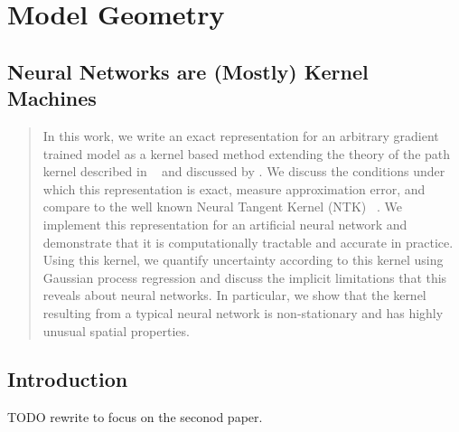 \chapter{Model Geometry}

\label{Chapter3} %

\section{Neural Networks are (Mostly) Kernel Machines}

\begin{abstract}
In this work, we write an exact representation for an arbitrary gradient trained model as a kernel based method extending the theory of the path kernel described in ~\cite{domingos2020} and discussed by \cite{chen2021equivalence}. We discuss the conditions under which this representation is exact, measure approximation error, and compare to the well known Neural Tangent Kernel (NTK) ~\cite{jacot2018neural}. We implement this representation for an artificial neural network and demonstrate that it is computationally tractable and accurate in practice. Using this kernel, we quantify uncertainty according to this kernel using Gaussian process regression and discuss the implicit limitations that this reveals about neural networks. In particular, we show that the kernel resulting from a typical neural network is non-stationary and has highly unusual spatial properties. 
\end{abstract}


\section{Introduction}
TODO rewrite to focus on the seconod paper. 

